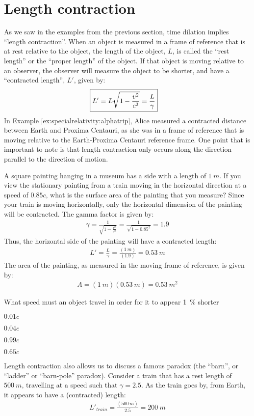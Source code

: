 \section{Length contraction}
As we saw in the examples from the previous section, time dilation implies ``length contraction''. When an object is measured in a frame of reference that is at rest relative to the object, the length of the object, $L$, is called the ``rest length'' or the ``proper length'' of the object. If that object is moving relative to an observer, the observer will measure the object to be shorter, and have a ``contracted length'', $L'$, given by:
\begin{align*}
\Aboxed{L'=L\sqrt{1-\frac{v^2}{c^2}} =\frac{L}{\gamma}}
\end{align*}
In Example \ref{ex:specialrelativity:alphatrip}, Alice measured a contracted distance between Earth and Proxima Centauri, as she was in a frame of reference that is moving relative to the Earth-Proxima Centauri reference frame. One point that is important to note is that length contraction only occurs along the direction parallel to the direction of motion.
\newpage
\begin{example}{A square painting hanging in a museum has a side with a length of $\SI{1}{m}$. If you view the stationary painting from a train moving in the horizontal direction at a speed of $0.85c$, what is the surface area of the painting that you measure?}
Since your train is moving horizontally, only the horizontal dimension of the painting will be contracted. The gamma factor is given by:
\begin{align*}
\gamma = \frac{1}{\sqrt{1-\frac{v^2}{c^2}}} =\frac{1}{\sqrt{1-0.85^2}}=1.9
\end{align*}
Thus, the horizontal side of the painting will have a contracted length:
\begin{align*}
L'=\frac{L}{\gamma}=\frac{(\SI{1}{m})}{(1.9)}=\SI{0.53}{m}
\end{align*}
The area of the painting, as measured in the moving frame of reference, is given by:
\begin{align*}
A= (\SI{1}{m})(\SI{0.53}{m})=\SI{0.53}{m^2}
\end{align*}
\end{example}
\begin{checkpoint}{}
	\begin{MCquestion}{What speed must an object travel in order for it to appear \SI{1}{\percent} shorter}
		\item $0.01c$
		\item $0.04c$ \correct
		\item $0.99c$
		\item $0.65c$
	\end{MCquestion}
\end{checkpoint}
Length contraction also allows us to discuss a famous paradox (the ``barn'', or ``ladder'' or ``barn-pole'' paradox). Consider a train that has a rest length of $\SI{500}{m}$, travelling at a speed such that $\gamma = 2.5$. As the train goes by, from Earth, it appears to have a (contracted) length:
\begin{align*}
L'_{train}=\frac{(\SI{500}{m})}{2.5}=\SI{200}{m}
\end{align*}

